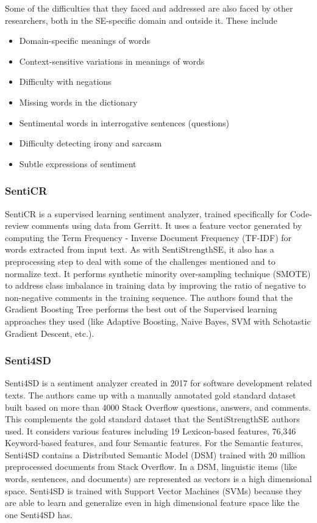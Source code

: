 \documentclass[conference]{IEEEtran}
\begin{document}
Some of the difficulties that they faced and addressed are also faced by other researchers, both in the SE-specific domain and outside it. These include
\begin{itemize}
    \item Domain-specific meanings of words
    \item Context-sensitive variations in meanings of words
    \item Difficulty with negations
    \item Missing words in the dictionary
    \item Sentimental words in interrogative sentences (questions)
    \item Difficulty detecting irony and sarcasm
    \item Subtle expressions of sentiment\\
\end{itemize}

\subsubsection{SentiCR}
SentiCR is a supervised learning sentiment analyzer, trained specifically for Code-review comments using data from Gerritt. It uses a feature vector generated by computing the Term Frequency - Inverse Document Frequency (TF-IDF) for words extracted from input text. As with SentiStrengthSE, it also has a preprocessing step to deal with some of the challenges mentioned and to normalize text. It performs synthetic minority over-sampling technique (SMOTE) to address class imbalance in training data by improving the ratio of negative to non-negative comments in the training sequence. The authors found that the Gradient Boosting Tree performs the best out of the Supervised learning approaches they used\cite{b19} (like Adaptive Boosting, Naive Bayes, SVM with Schotastic Gradient Descent, etc.).\\

\subsubsection{Senti4SD}
Senti4SD is a sentiment analyzer created in 2017 for software development related texts. The authors came up with a manually annotated gold standard dataset built based on more than 4000 Stack Overflow questions, answers, and comments. This complements the gold standard dataset that the SentiStrengthSE authors used. It considers various features including 19 Lexicon-based features, 76,346 Keyword-based features, and four Semantic features\cite{b18}. For the Semantic features, Senti4SD contains a Distributed Semantic Model (DSM) trained with 20 million preprocessed documents from Stack Overflow. In a DSM, linguistic items (like words, sentences, and documents) are represented as vectors is a high dimensional space. Senti4SD is trained with Support Vector Machines (SVMs) because they are able to learn and generalize even in high dimensional feature space like the one Senti4SD has.\\
\end{document}
